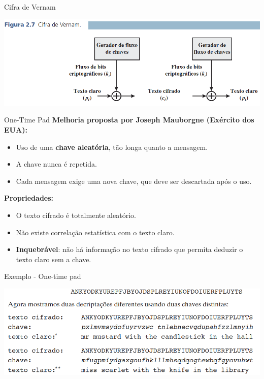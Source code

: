 \begin{frame}{Cifra de Vernam}

    
    \centering
    \includegraphics[width=\linewidth]{Figuras/cifra-de-vernam.png}



\end{frame}


\begin{frame}{One-Time Pad}
\textbf{Melhoria proposta por Joseph Mauborgne (Exército dos EUA):}  
\begin{itemize}
    \item Uso de uma \textbf{chave aleatória}, tão longa quanto a mensagem.  
    \item A chave nunca é repetida.  
    \item Cada mensagem exige uma nova chave, que deve ser descartada após o uso.  
\end{itemize}

\medskip
\textbf{Propriedades:}  
\begin{itemize}
    \item O texto cifrado é totalmente aleatório.  
    \item Não existe correlação estatística com o texto claro.  
    \item \textbf{Inquebrável}: não há informação no texto cifrado que permita deduzir o texto claro sem a chave.  
\end{itemize}

\end{frame}

\begin{frame}{Exemplo - One-time pad}

    
    \centering
    \includegraphics[width=\linewidth]{Figuras/exemplo-one-time-pad.png}



\end{frame}

